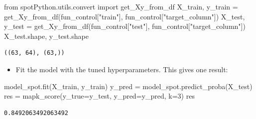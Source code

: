 \documentclass[
  letterpaper,
  DIV=11,
  numbers=noendperiod]{scrreprt}
\newenvironment{Shaded}{\begin{snugshade}}{\end{snugshade}}
\newcommand{\DecValTok}[1]{\textcolor[rgb]{0.68,0.00,0.00}{#1}}
\newcommand{\ImportTok}[1]{\textcolor[rgb]{0.00,0.46,0.62}{#1}}
\newcommand{\NormalTok}[1]{\textcolor[rgb]{0.00,0.23,0.31}{#1}}
\newcommand{\OperatorTok}[1]{\textcolor[rgb]{0.37,0.37,0.37}{#1}}
\newcommand{\StringTok}[1]{\textcolor[rgb]{0.13,0.47,0.30}{#1}}
\providecommand{\tightlist}{%
  \setlength{\itemsep}{0pt}\setlength{\parskip}{0pt}}\usepackage{longtable,booktabs,array}
\begin{document}
\begin{Shaded}
\begin{Highlighting}[]
\ImportTok{from}\NormalTok{ spotPython.utils.convert }\ImportTok{import}\NormalTok{ get\_Xy\_from\_df}
\NormalTok{X\_train, y\_train }\OperatorTok{=}\NormalTok{ get\_Xy\_from\_df(fun\_control[}\StringTok{"train"}\NormalTok{], fun\_control[}\StringTok{"target\_column"}\NormalTok{])}
\NormalTok{X\_test, y\_test }\OperatorTok{=}\NormalTok{ get\_Xy\_from\_df(fun\_control[}\StringTok{"test"}\NormalTok{], fun\_control[}\StringTok{"target\_column"}\NormalTok{])}
\NormalTok{X\_test.shape, y\_test.shape}
\end{Highlighting}
\end{Shaded}

\begin{verbatim}
((63, 64), (63,))
\end{verbatim}

\begin{itemize}
\tightlist
\item
  Fit the model with the tuned hyperparameters. This gives one result:
\end{itemize}

\begin{Shaded}
\begin{Highlighting}[]
\NormalTok{model\_spot.fit(X\_train, y\_train)}
\NormalTok{y\_pred }\OperatorTok{=}\NormalTok{ model\_spot.predict\_proba(X\_test)}
\NormalTok{res }\OperatorTok{=}\NormalTok{ mapk\_score(y\_true}\OperatorTok{=}\NormalTok{y\_test, y\_pred}\OperatorTok{=}\NormalTok{y\_pred, k}\OperatorTok{=}\DecValTok{3}\NormalTok{)}
\NormalTok{res}
\end{Highlighting}
\end{Shaded}

\begin{verbatim}
0.8492063492063492
\end{verbatim}
\end{document}
